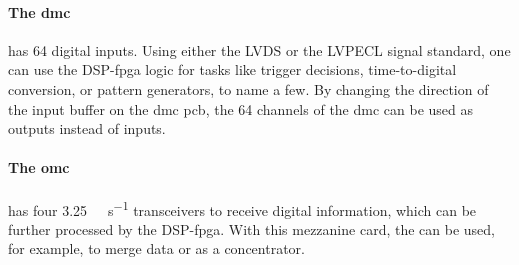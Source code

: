 \paragraph{The \ac{dmc}} has 64 digital inputs. 
Using either the LVDS or the LVPECL signal standard, one can use the DSP-\ac{fpga} logic for tasks like trigger decisions, time-to-digital conversion, or pattern generators, to name a few.
By changing the direction of the input buffer on the \ac{dmc} \ac{pcb}, the 64 channels of the \ac{dmc} can be used as outputs instead of inputs.

\paragraph{The \ac{omc}} has four \SI{3.25}{\giga\bit\per\second} transceivers to receive digital information, which can be further processed by the DSP-\ac{fpga}.
With this mezzanine card, the  can be used, for example, to merge data or as a concentrator.


